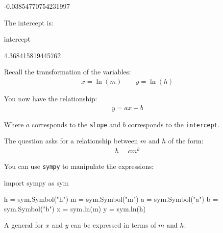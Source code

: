 \begin{raw}
-0.03854770754231997
\end{raw}





The intercept is:




\begin{pyin}
intercept
\end{pyin}





\begin{raw}
4.368415819445762
\end{raw}





Recall the transformation of the variables:
\begin{equation*}
\begin{split}x=\ln(m)\qquad y=\ln(h)\end{split}
\end{equation*}

You now have the relationship:
\begin{equation*}
\begin{split}y=ax + b\end{split}
\end{equation*}

Where \(a\) corresponds to the \texttt{slope} and \(b\) corresponds to the
\texttt{intercept}.


The question asks for a relationship between \(m\) and \(h\) of the form:
\begin{equation*}
\begin{split}h=cm^k\end{split}
\end{equation*}

You can use \texttt{sympy} to manipulate the expressions:




\begin{pyin}
import sympy as sym

h = sym.Symbol("h")
m = sym.Symbol("m")
a = sym.Symbol("a")
b = sym.Symbol("b")
x = sym.ln(m)
y = sym.ln(h)
\end{pyin}





A general  for \(x\) and \(y\) can be expressed in terms of \(m\) and
\(h\):




